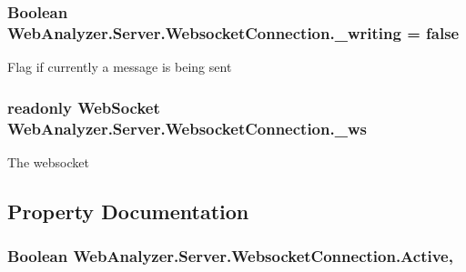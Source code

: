 \subsubsection[{\+\_\+writing}]{\setlength{\rightskip}{0pt plus 5cm}Boolean Web\+Analyzer.\+Server.\+Websocket\+Connection.\+\_\+writing = {\bf false}\hspace{0.3cm}{\ttfamily [private]}}\label{class_web_analyzer_1_1_server_1_1_websocket_connection_a19b519a7ec81f0898724fcdefb8c6f62}


Flag if currently a message is being sent 

\hypertarget{class_web_analyzer_1_1_server_1_1_websocket_connection_a8b3efea13ab70fe8a5c866930ef7a263}{}
\subsubsection[{\+\_\+ws}]{\setlength{\rightskip}{0pt plus 5cm}readonly Web\+Socket Web\+Analyzer.\+Server.\+Websocket\+Connection.\+\_\+ws\hspace{0.3cm}{\ttfamily [private]}}\label{class_web_analyzer_1_1_server_1_1_websocket_connection_a8b3efea13ab70fe8a5c866930ef7a263}


The websocket 



\subsection{Property Documentation}
\hypertarget{class_web_analyzer_1_1_server_1_1_websocket_connection_af64b83d9aec7d436a262f732e3b03e0b}{}
\subsubsection[{Active}]{\setlength{\rightskip}{0pt plus 5cm}Boolean Web\+Analyzer.\+Server.\+Websocket\+Connection.\+Active\hspace{0.3cm}{\ttfamily [get]}, {\ttfamily [set]}}\label{class_web_analyzer_1_1_server_1_1_websocket_connection_af64b83d9aec7d436a262f732e3b03e0b}


